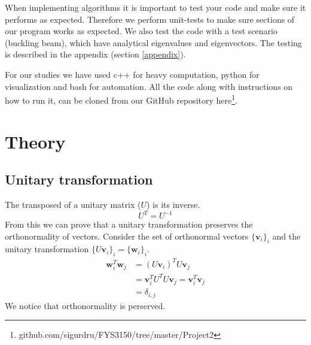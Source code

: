 \documentclass[reprint,english,notitlepage,nofootinbib]{revtex4-1}  %
\begin{document}
When implementing algorithms it is important to test your code and make sure it performs as expected. Therefore we perform unit-tests to make sure sections of our program works as expected. We also test the code with a test scenario (buckling beam), which have analytical eigenvalues and eigenvectors. The testing is described in the appendix (section \ref{appendix}).

For our studies we have used c++ for heavy computation, python for visualization and bash for automation. All the code along with instructions on how to run it, can be cloned from our GitHub repository here\footnote{github.com/sigurdru/FYS3150/tree/master/Project2}.


\section{Theory}

\subsection{Unitary transformation}
The transposed of a unitary matrix ($U$) is its inverse.
\begin{equation*}
	U^T = U^{-1}
\end{equation*}
From this we can prove that a unitary transformation preserves the orthonormality of vectors. Consider the set of orthonormal vectors $\{ \mathbf{v}_i \}_i$ and the unitary transformation $\{ U\mathbf{v}_i \}_i = \{ \mathbf{w}_i \}_i$.
\begin{align*}
	\mathbf{w}_i^T\mathbf{w}_j &= (U\mathbf{v}_i)^TU\mathbf{v}_j \\
	&= \mathbf{v}_i^TU^TU\mathbf{v}_j = \mathbf{v}_i^T\mathbf{v}_j \\
	&= \delta_{i,j}
\end{align*}
We notice that orthonormality is perserved.
\end{document}

